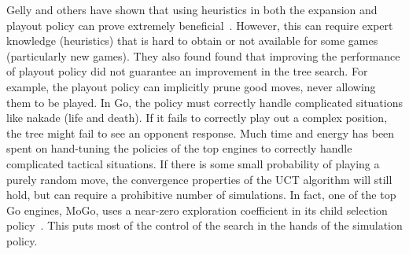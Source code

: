 \documentclass{acm_proc_article-sp}
\begin{document}
Gelly and others have shown that using heuristics in both the expansion and playout policy can prove extremely beneficial~\cite{gelly2006modification,gelly2008achieving}. However, this can require expert knowledge (heuristics) that is hard to obtain or not available for some games (particularly new games). They also found found that improving the performance of playout policy did not guarantee an improvement in the tree search. For example, the playout policy can implicitly prune good moves, never allowing them to be played. In Go, the policy must correctly handle complicated situations like nakade (life and death). If it fails to correctly play out a complex position, the tree might fail to see an opponent response. Much time and energy has been spent on hand-tuning the policies of the top engines to correctly handle complicated tactical situations. If there is some small probability of playing a purely random move, the convergence properties of the UCT algorithm will still hold, but can require a prohibitive number of simulations.
In fact, one of the top Go engines, MoGo, uses a near-zero exploration coefficient in its child selection policy~\cite{gelly2007combining}. This puts most of the control of the search in the hands of the simulation policy.
%
%
%
\end{document}
